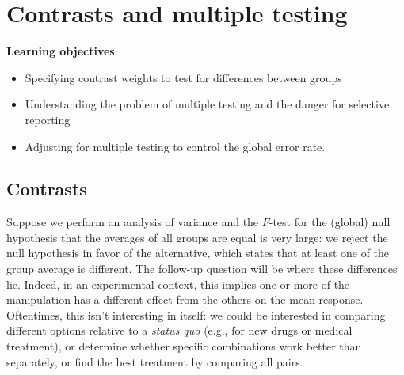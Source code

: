\documentclass[
  11pt,
  letterpaper,
]{scrbook}
\providecommand{\tightlist}{%
  \setlength{\itemsep}{0pt}\setlength{\parskip}{0pt}}\usepackage{longtable,booktabs,array}
\theoremstyle{definition}
\theoremstyle{remark}
\begin{document}

\hypertarget{contrasts-multiple-testing}{%
\chapter{Contrasts and multiple
testing}\label{contrasts-multiple-testing}}

\begin{tcolorbox}[enhanced jigsaw, colback=white, coltitle=black, rightrule=.15mm, left=2mm, bottomrule=.15mm, toprule=.15mm, titlerule=0mm, colframe=quarto-callout-important-color-frame, leftrule=.75mm, title=\textcolor{quarto-callout-important-color}{\faExclamation}\hspace{0.5em}{Key concept}, breakable, arc=.35mm, colbacktitle=quarto-callout-important-color!10!white, opacitybacktitle=0.6, opacityback=0, toptitle=1mm, bottomtitle=1mm]

\textbf{Learning objectives}:

\begin{itemize}
\tightlist
\item
  Specifying contrast weights to test for differences between groups
\item
  Understanding the problem of multiple testing and the danger for
  selective reporting
\item
  Adjusting for multiple testing to control the global error rate.
\end{itemize}

\end{tcolorbox}

\hypertarget{contrasts}{%
\section{Contrasts}\label{contrasts}}

Suppose we perform an analysis of variance and the \(F\)-test for the
(global) null hypothesis that the averages of all groups are equal is
very large: we reject the null hypothesis in favor of the alternative,
which states that at least one of the group average is different. The
follow-up question will be where these differences lie. Indeed, in an
experimental context, this implies one or more of the manipulation has a
different effect from the others on the mean response. Oftentimes, this
isn't interesting in itself: we could be interested in comparing
different options relative to a \emph{status quo} (e.g., for new drugs
or medical treatment), or determine whether specific combinations work
better than separately, or find the best treatment by comparing all
pairs.
\end{document}
